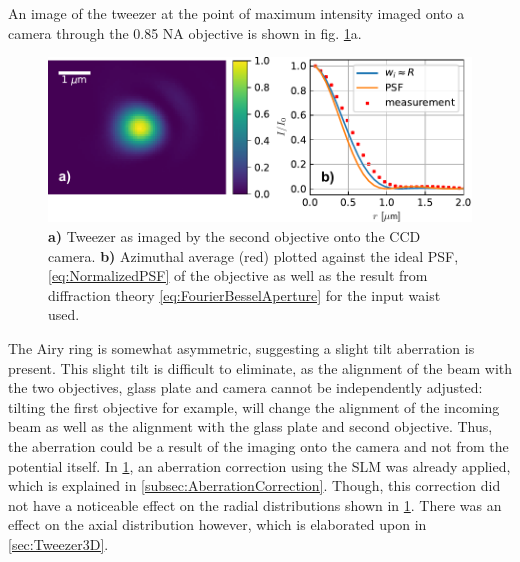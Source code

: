 An image of the tweezer at the point of maximum intensity imaged onto a camera through the 0.85 NA objective is shown in fig. \ref{fig:2Dresults}a. 
\begin{figure}
    \centering
    \includegraphics[width=\linewidth]{figures/AzimuthalAverageSpotZoomed.pdf}
    \caption{\textbf{a)} Tweezer as imaged by the second objective onto the CCD camera. 
	\textbf{ b)} Azimuthal average (red) plotted against the ideal \ac{PSF}, \cref{eq:NormalizedPSF} of the objective as well as the result from diffraction theory \cref{eq:FourierBesselAperture} for the input waist used.}
    \label{fig:2Dresults}
\end{figure}
The Airy ring is somewhat asymmetric, suggesting a slight tilt aberration is present.
This slight tilt is difficult to eliminate, as the alignment of the beam with the two objectives, glass plate and camera cannot be independently adjusted: tilting the first objective for example, will change the alignment of the incoming beam as well as the alignment with the glass plate and second objective.
Thus, the aberration could be a result of the imaging onto the camera and not from the potential itself.
In \cref{fig:2Dresults}, an aberration correction using the \ac{SLM} was already applied, which is explained in \cref{subsec:AberrationCorrection}. 
Though, this correction did not have a noticeable effect on the radial distributions shown in \cref{fig:2Dresults}.
There was an effect on the axial distribution however, which is elaborated upon in \cref{sec:Tweezer3D}.

